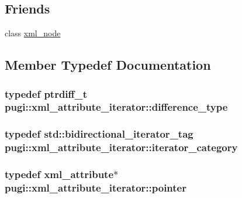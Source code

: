 \subsection*{Friends}
\begin{DoxyCompactItemize}
\item 
class \hyperlink{classpugi_1_1xml__attribute__iterator_a156d917a92815c7b593bd5ef19f6d5fb}{xml\-\_\-node}
\end{DoxyCompactItemize}


\subsection{Member Typedef Documentation}
\hypertarget{classpugi_1_1xml__attribute__iterator_a00b3eecf2aba886a673ad2319be88618}{
\subsubsection[{difference\-\_\-type}]{\setlength{\rightskip}{0pt plus 5cm}typedef ptrdiff\-\_\-t {\bf pugi\-::xml\-\_\-attribute\-\_\-iterator\-::difference\-\_\-type}}}\label{classpugi_1_1xml__attribute__iterator_a00b3eecf2aba886a673ad2319be88618}
\hypertarget{classpugi_1_1xml__attribute__iterator_aad988273a3e4cdc5fa3eb879dbdc8d35}{
\subsubsection[{iterator\-\_\-category}]{\setlength{\rightskip}{0pt plus 5cm}typedef std\-::bidirectional\-\_\-iterator\-\_\-tag {\bf pugi\-::xml\-\_\-attribute\-\_\-iterator\-::iterator\-\_\-category}}}\label{classpugi_1_1xml__attribute__iterator_aad988273a3e4cdc5fa3eb879dbdc8d35}
\hypertarget{classpugi_1_1xml__attribute__iterator_a6ed6fb3197abb02ffa848ad6b9b7a1be}{
\subsubsection[{pointer}]{\setlength{\rightskip}{0pt plus 5cm}typedef {\bf xml\-\_\-attribute}$\ast$ {\bf pugi\-::xml\-\_\-attribute\-\_\-iterator\-::pointer}}}\label{classpugi_1_1xml__attribute__iterator_a6ed6fb3197abb02ffa848ad6b9b7a1be}

